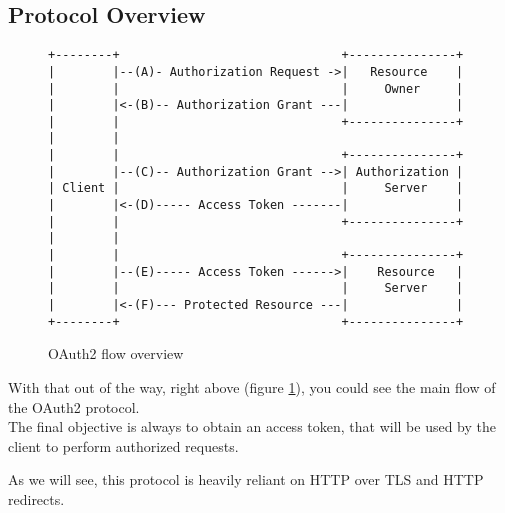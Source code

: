 \subsection{Protocol Overview}
\begin{figure}[h]
    \centering
    \begin{BVerbatim}
+--------+                               +---------------+
|        |--(A)- Authorization Request ->|   Resource    |
|        |                               |     Owner     |
|        |<-(B)-- Authorization Grant ---|               |
|        |                               +---------------+
|        |
|        |                               +---------------+
|        |--(C)-- Authorization Grant -->| Authorization |
| Client |                               |     Server    |
|        |<-(D)----- Access Token -------|               |
|        |                               +---------------+
|        |
|        |                               +---------------+
|        |--(E)----- Access Token ------>|    Resource   |
|        |                               |     Server    |
|        |<-(F)--- Protected Resource ---|               |
+--------+                               +---------------+
    \end{BVerbatim}
    \caption{OAuth2 flow overview}
    \label{fig:oauth-flow-overview}
\end{figure}

With that out of the way, right above (figure \ref{fig:oauth-flow-overview}),
you could see the main flow of the OAuth2 protocol.
\\
The final objective is always to obtain an access token, that will be used by
the client to perform authorized requests.

As we will see, this protocol is heavily reliant on HTTP over TLS
\cite{ietf-https} and HTTP redirects.


